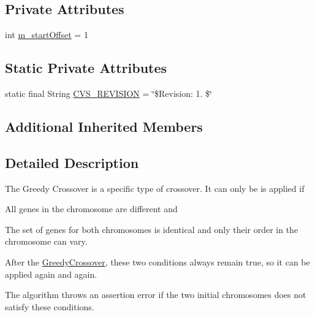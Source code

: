 \subsection*{Private Attributes}
\begin{DoxyCompactItemize}
\item 
int \hyperlink{classorg_1_1jgap_1_1impl_1_1_greedy_crossover_a2c851e311ad5a263c915e01d8a30aa70}{m\-\_\-start\-Offset} = 1
\end{DoxyCompactItemize}
\subsection*{Static Private Attributes}
\begin{DoxyCompactItemize}
\item 
static final String \hyperlink{classorg_1_1jgap_1_1impl_1_1_greedy_crossover_ab6ee35a26acab5f96032250a6a5d2696}{C\-V\-S\-\_\-\-R\-E\-V\-I\-S\-I\-O\-N} = \char`\"{}\$Revision\-: 1. \$\char`\"{}
\end{DoxyCompactItemize}
\subsection*{Additional Inherited Members}


\subsection{Detailed Description}
The Greedy Crossover is a specific type of crossover. It can only be is applied if 
\begin{DoxyItemize}
\item 
\begin{DoxyEnumerate}
\item All genes in the chromosome are different and  
\end{DoxyEnumerate}
\item 
\begin{DoxyEnumerate}
\item The set of genes for both chromosomes is identical and only their order in the chromosome can vary.  
\end{DoxyEnumerate}
\end{DoxyItemize}

After the \hyperlink{classorg_1_1jgap_1_1impl_1_1_greedy_crossover}{Greedy\-Crossover}, these two conditions always remain true, so it can be applied again and again.

The algorithm throws an assertion error if the two initial chromosomes does not satisfy these conditions.

